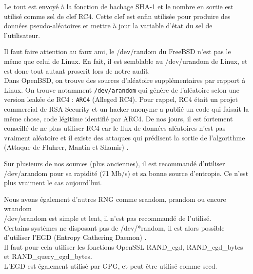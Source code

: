 			Le tout est envoyé à la fonction de hachage SHA-1 et le nombre en 
			sortie est utilisé comme sel de clef RC4.  
			Cette clef est enfin utilisée pour produire des données 
			pseudo-aléatoires et mettre à jour la variable d'état du sel de 
			l'utilisateur. 
			
			
			Il faut faire attention au faux ami, le /dev/random du FreeBSD n'est 
			pas le même que celui de Linux.
			En fait, il est semblable au /dev/urandom de Linux, et est donc tout 
			autant proscrit lors de notre audit.\\
			
			Dans OpenBSD, on trouve des sources d'aléatoire supplémentaires 
			par rapport à Linux. On trouve notamment \texttt{/dev/arandom} qui 
			génère de l'aléatoire selon une version leakée de RC4 :
			\texttt{ARC4} (Alleged RC4). Pour rappel, RC4 était un projet
			commercial de RSA Security et un hacker anonyme a publié un 
			code qui faisait la même chose, code légitime identifié par ARC4. 
			De nos jours, il est fortement conseillé de ne plus utiliser RC4 
			car le flux de données aléatoires n'est pas vraiment 
			aléatoire et il existe des attaques qui prédisent la sortie de 
			l'algorithme (Attaque de Fluhrer, Mantin et Shamir) 
			\nocite{Fluhrer01weaknessesin}.	
			
			Sur plusieurs de nos sources (plus anciennes), il est recommandé
			d'utiliser /dev/arandom pour sa rapidité (71 Mb/s) et sa bonne 
			source d'entropie. Ce n'est plus vraiment le cas aujourd'hui.\\

	
		
			Nous avons également d'autres RNG comme srandom, prandom ou
			encore wrandom \cite{miros2013}\\
			
			/dev/srandom est simple et lent, il n'est pas recommandé de 
			l'utilisé.\\
		
			Certains systèmes ne disposant pas de /dev/*random, il est alors 
			possible d'utiliser l'EGD (Entropy Gathering Daemon) 
			\cite{egdsf.net}.\\
			
			Il faut pour cela utiliser les fonctions OpenSSL RAND\_egd, 
			RAND\_egd\_bytes et RAND\_query\_egd\_bytes. \\

			L'EGD est également utilisé par GPG, et peut être utilisé comme 
			seed.
			
